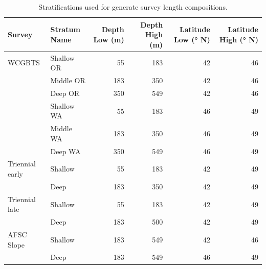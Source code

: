 \documentclass[
  english,
]{article}
\begin{document}
\begin{longtable}{llrrrr}

\caption{\label{tbl-survey_strata}Stratifications used for generate
survey length compositions.}

\tabularnewline

\toprule
Survey & Stratum Name & Depth Low (m) & Depth High (m) & Latitude Low (° N) & Latitude High (° N) \\ 
\midrule\addlinespace[2.5pt]
WCGBTS & Shallow OR & 55 & 183 & 42 & 46 \\ 
 & Middle OR & 183 & 350 & 42 & 46 \\ 
 & Deep OR & 350 & 549 & 42 & 46 \\ 
 & Shallow WA & 55 & 183 & 46 & 49 \\ 
 & Middle WA & 183 & 350 & 46 & 49 \\ 
 & Deep WA & 350 & 549 & 46 & 49 \\ 
Triennial early & Shallow & 55 & 183 & 42 & 49 \\ 
 & Deep & 183 & 350 & 42 & 49 \\ 
Triennial late & Shallow & 55 & 183 & 42 & 49 \\ 
 & Deep & 183 & 500 & 42 & 49 \\ 
AFSC Slope & Shallow & 183 & 549 & 42 & 46 \\ 
 & Deep & 183 & 549 & 46 & 49 \\ 
\bottomrule

\end{longtable}

\endgroup

\newpage{}

\begingroup
\fontsize{9.0pt}{11.0pt}\selectfont
\end{document}
